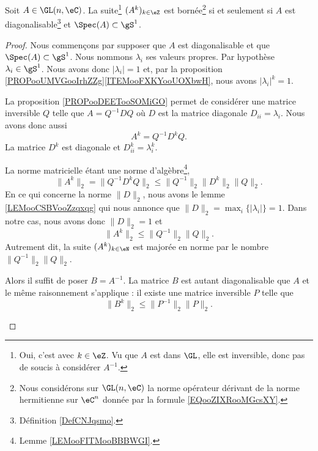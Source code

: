 \begin{proposition}            \label{PROPooHXJAooGaDtme}
	Soit \( A\in\GL(n,\eC)\). La suite\footnote{Oui, c'est avec \( k\in \eZ\). Vu que \( A\) est dans \( \GL\), elle est inversible, donc pas de soucis à considérer \( A^{-1}\).} \( (A^k)_{k\in \eZ}\) est bornée\footnote{Nous considérons sur \( \GL(n,\eC)\) la norme opérateur dérivant de la norme hermitienne sur \( \eC^n\) donnée par la formule \eqref{EQooZIXRooMGcsXY}.} si et seulement si \( A\) est diagonalisable\footnote{Définition \ref{DefCNJqsmo}.} et \( \Spec(A)\subset \gS^1\).
\end{proposition}

\begin{proof}
	Nous commençons par supposer que \( A\) est diagonalisable et que \( \Spec(A)\subset \gS^1\). Nous nommons \( \lambda_i\) ses valeurs propres. Par hypothèse \( \lambda_i\in \gS^1\). Nous avons donc \( | \lambda_i |=1\) et, par la proposition \ref{PROPooUMVGooIrhZZg}\ref{ITEMooFXKYooUOXbwH}, nous avons \( | \lambda_i |^k=1\).

	La proposition \ref{PROPooDEETooSOMiGO} permet de considérer une matrice inversible \( Q\) telle que \( A=Q^{-1}DQ\) où \( D\) est la matrice diagonale \( D_{ii}=\lambda_i\). Nous avons donc aussi
	\begin{equation}
		A^k=Q^{-1}D^kQ.
	\end{equation}
	La matrice \( D^k\) est diagonale et \( D^k_{ii}=\lambda_i^k\).

	\begin{subproof}
		La norme matricielle étant une norme d'algèbre\footnote{Lemme \ref{LEMooFITMooBBBWGI}.},
		\begin{equation}
			\| A^k \|_2=\| Q^{-1}D^kQ \|_2\leq \| Q^{-1} \|_2\| D^k \|_2\| Q \|_2.
		\end{equation}
		En ce qui concerne la norme \( \| D \|_2\), nous avons le lemme \ref{LEMooCSBVooZzqxqg} qui nous annonce que \( \| D \|_2=\max_i \{| \lambda_i |\}=1 \). Dans notre cas, nous avons donc \( \| D \|_2=1\) et
		\begin{equation}
			\| A^k \|_2\leq \| Q^{-1} \|_2\| Q \|_2.
		\end{equation}
		Autrement dit, la suite \( (A^k)_{k\in \eN}\) est majorée en norme par le nombre \( \| Q^{-1} \|_2\| Q \|_2\).

		Alors il suffit de poser \( B=A^{-1}\). La matrice \( B\) est autant diagonalisable que \( A\) et le même raisonnement s'applique : il existe une matrice inversible \( P\) telle que
		\begin{equation}
			\| B^k \|_2\leq \| P^{-1} \|_2\| P \|_2.
		\end{equation}


\end{subproof}
\end{proof}
